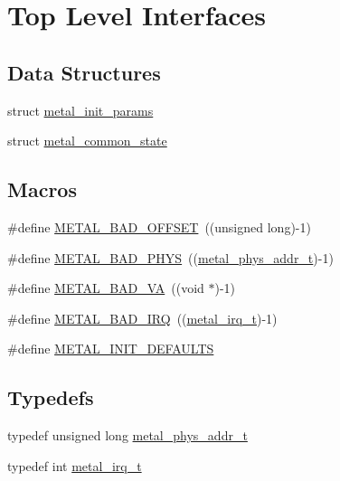 \hypertarget{group__system}{}\section{Top Level Interfaces}
\label{group__system}
\subsection*{Data Structures}
\begin{DoxyCompactItemize}
\item 
struct \hyperlink{structmetal__init__params}{metal\+\_\+init\+\_\+params}
\item 
struct \hyperlink{structmetal__common__state}{metal\+\_\+common\+\_\+state}
\end{DoxyCompactItemize}
\subsection*{Macros}
\begin{DoxyCompactItemize}
\item 
\#define \hyperlink{group__system_ga260e9f1bcb0425ebb9d186597ae2c7de}{M\+E\+T\+A\+L\+\_\+\+B\+A\+D\+\_\+\+O\+F\+F\+S\+ET}~((unsigned long)-\/1)
\item 
\#define \hyperlink{group__system_ga70a38525cebabfe1d709804619a6aa93}{M\+E\+T\+A\+L\+\_\+\+B\+A\+D\+\_\+\+P\+H\+YS}~((\hyperlink{group__system_gae024fa10b72199a3e26c29b6eb97df5d}{metal\+\_\+phys\+\_\+addr\+\_\+t})-\/1)
\item 
\#define \hyperlink{group__system_ga1fd6bb89456538030d008f976708224c}{M\+E\+T\+A\+L\+\_\+\+B\+A\+D\+\_\+\+VA}~((void $\ast$)-\/1)
\item 
\#define \hyperlink{group__system_ga7b9c79fbe0ae59c5c0c1092af01764d1}{M\+E\+T\+A\+L\+\_\+\+B\+A\+D\+\_\+\+I\+RQ}~((\hyperlink{group__system_ga5b3ecd7ba1914b26547392ceadec813c}{metal\+\_\+irq\+\_\+t})-\/1)
\item 
\#define \hyperlink{group__system_ga2c3fc3d52edbcb37a35e1344b38cf47a}{M\+E\+T\+A\+L\+\_\+\+I\+N\+I\+T\+\_\+\+D\+E\+F\+A\+U\+L\+TS}
\end{DoxyCompactItemize}
\subsection*{Typedefs}
\begin{DoxyCompactItemize}
\item 
typedef unsigned long \hyperlink{group__system_gae024fa10b72199a3e26c29b6eb97df5d}{metal\+\_\+phys\+\_\+addr\+\_\+t}
\item 
typedef int \hyperlink{group__system_ga5b3ecd7ba1914b26547392ceadec813c}{metal\+\_\+irq\+\_\+t}
\end{DoxyCompactItemize}
